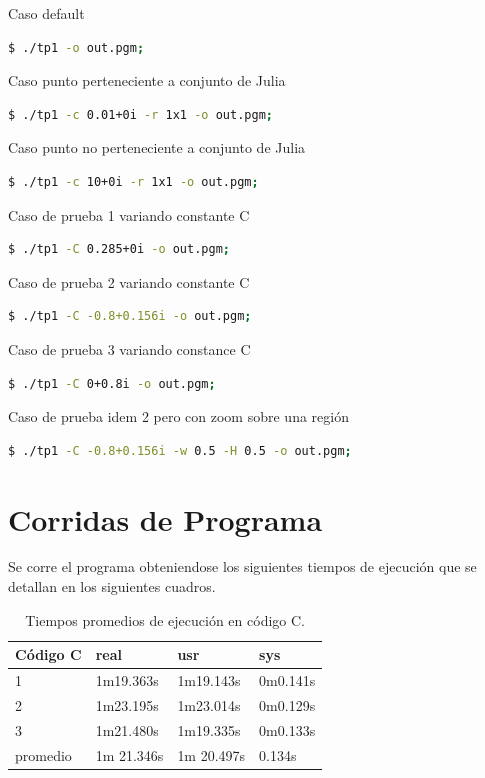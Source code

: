 \documentclass{article}
\begin{document}
Caso default

\begin{lstlisting}[language=bash]
 $ ./tp1 -o out.pgm;
\end{lstlisting}

Caso punto perteneciente a conjunto de Julia

\begin{lstlisting}[language=bash]
 $ ./tp1 -c 0.01+0i -r 1x1 -o out.pgm;
\end{lstlisting}

Caso punto no perteneciente a conjunto de Julia

\begin{lstlisting}[language=bash]
 $ ./tp1 -c 10+0i -r 1x1 -o out.pgm;
\end{lstlisting}

Caso de prueba 1 variando constante C

\begin{lstlisting}[language=bash]
 $ ./tp1 -C 0.285+0i -o out.pgm;
\end{lstlisting}

Caso de prueba 2 variando constante C

\begin{lstlisting}[language=bash]
 $ ./tp1 -C -0.8+0.156i -o out.pgm;
\end{lstlisting}

Caso de prueba 3 variando constance C

\begin{lstlisting}[language=bash]
 $ ./tp1 -C 0+0.8i -o out.pgm;
\end{lstlisting}

Caso de prueba idem 2 pero con zoom sobre una región

\begin{lstlisting}[language=bash]
 $ ./tp1 -C -0.8+0.156i -w 0.5 -H 0.5 -o out.pgm;
\end{lstlisting}

\clearpage


\section{Corridas de Programa}

Se corre el programa obteniendose los siguientes tiempos de ejecución que se detallan en los siguientes cuadros.

\begin{table}[htbp]
\begin{center}
\begin{tabular}{|l|l|l|l|}
\hline
Código C & real & usr & sys \\
\hline \hline
1 & 1m19.363s & 1m19.143s & 0m0.141s \\ \hline
2 & 1m23.195s & 1m23.014s & 0m0.129s \\ \hline
3 & 1m21.480s & 1m19.335s & 0m0.133s \\ \hline
promedio & 1m 21.346s & 1m 20.497s & 0.134s
\end{tabular}
\caption{Tiempos promedios de ejecución en código C.}
\end{center}
\end{table}
\end{document}
